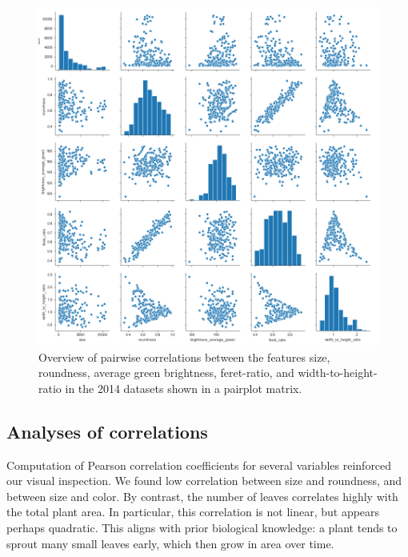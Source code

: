 \documentclass[paper=A4,bibliography=totocnumbered]{scrartcl}
\begin{document}
 
\begin{figure}[h]
	\centering
	\includegraphics[width=13cm]{pic/overview}
	\caption{Overview of pairwise correlations between the features size, roundness, average green brightness, feret-ratio, and width-to-height-ratio in the 2014 datasets shown in a pairplot matrix.}
	\label{fig:overview}
\end{figure}


\subsection{Analyses of correlations}

Computation of Pearson correlation coefficients for several variables reinforced our visual inspection. We found low correlation between size and roundness, and between size and color. By contrast, the number of leaves correlates highly with the total plant area. In particular, this correlation is not linear, but appears perhaps quadratic. This aligns with prior biological knowledge: a plant tends to sprout many small leaves early, which then grow in area over time.
\end{document}
